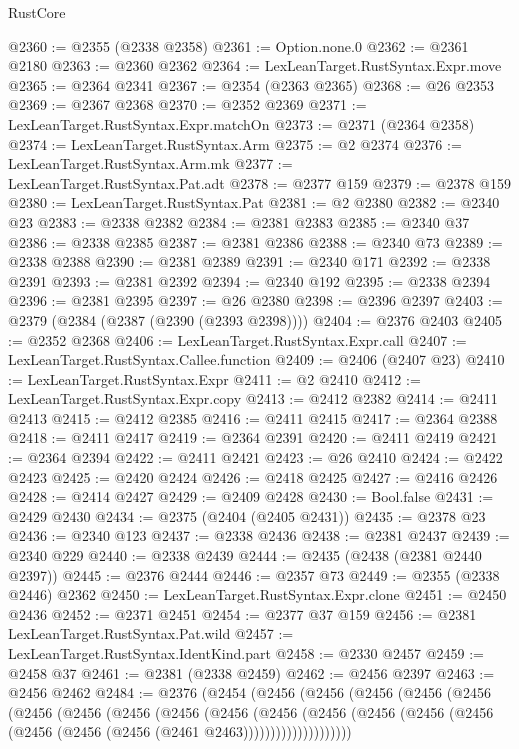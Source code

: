 \begin{lexlean}{RustCore}
\begin{coremodule}
@2360 := @2355 (@2338 @2358)
@2361 := Option.none.{0}
@2362 := @2361 @2180
@2363 := @2360 @2362
@2364 := LexLeanTarget.RustSyntax.Expr.move
@2365 := @2364 @2341
@2367 := @2354 (@2363 @2365)
@2368 := @26 @2353
@2369 := @2367 @2368
@2370 := @2352 @2369
@2371 := LexLeanTarget.RustSyntax.Expr.matchOn
@2373 := @2371 (@2364 @2358)
@2374 := LexLeanTarget.RustSyntax.Arm
@2375 := @2 @2374
@2376 := LexLeanTarget.RustSyntax.Arm.mk
@2377 := LexLeanTarget.RustSyntax.Pat.adt
@2378 := @2377 @159
@2379 := @2378 @159
@2380 := LexLeanTarget.RustSyntax.Pat
@2381 := @2 @2380
@2382 := @2340 @23
@2383 := @2338 @2382
@2384 := @2381 @2383
@2385 := @2340 @37
@2386 := @2338 @2385
@2387 := @2381 @2386
@2388 := @2340 @73
@2389 := @2338 @2388
@2390 := @2381 @2389
@2391 := @2340 @171
@2392 := @2338 @2391
@2393 := @2381 @2392
@2394 := @2340 @192
@2395 := @2338 @2394
@2396 := @2381 @2395
@2397 := @26 @2380
@2398 := @2396 @2397
@2403 := @2379 (@2384 (@2387 (@2390 (@2393 @2398))))
@2404 := @2376 @2403
@2405 := @2352 @2368
@2406 := LexLeanTarget.RustSyntax.Expr.call
@2407 := LexLeanTarget.RustSyntax.Callee.function
@2409 := @2406 (@2407 @23)
@2410 := LexLeanTarget.RustSyntax.Expr
@2411 := @2 @2410
@2412 := LexLeanTarget.RustSyntax.Expr.copy
@2413 := @2412 @2382
@2414 := @2411 @2413
@2415 := @2412 @2385
@2416 := @2411 @2415
@2417 := @2364 @2388
@2418 := @2411 @2417
@2419 := @2364 @2391
@2420 := @2411 @2419
@2421 := @2364 @2394
@2422 := @2411 @2421
@2423 := @26 @2410
@2424 := @2422 @2423
@2425 := @2420 @2424
@2426 := @2418 @2425
@2427 := @2416 @2426
@2428 := @2414 @2427
@2429 := @2409 @2428
@2430 := Bool.false
@2431 := @2429 @2430
@2434 := @2375 (@2404 (@2405 @2431))
@2435 := @2378 @23
@2436 := @2340 @123
@2437 := @2338 @2436
@2438 := @2381 @2437
@2439 := @2340 @229
@2440 := @2338 @2439
@2444 := @2435 (@2438 (@2381 @2440 @2397))
@2445 := @2376 @2444
@2446 := @2357 @73
@2449 := @2355 (@2338 @2446) @2362
@2450 := LexLeanTarget.RustSyntax.Expr.clone
@2451 := @2450 @2436
@2452 := @2371 @2451
@2454 := @2377 @37 @159
@2456 := @2381 LexLeanTarget.RustSyntax.Pat.wild
@2457 := LexLeanTarget.RustSyntax.IdentKind.part
@2458 := @2330 @2457
@2459 := @2458 @37
@2461 := @2381 (@2338 @2459)
@2462 := @2456 @2397
@2463 := @2456 @2462
@2484 := @2376
    (@2454
      (@2456
        (@2456
          (@2456
            (@2456
              (@2456
                (@2456
                  (@2456
                    (@2456
                      (@2456
                        (@2456
                          (@2456
                            (@2456
                              (@2456
                                (@2456 (@2456 (@2456 (@2456 (@2456 (@2461 @2463))))))))))))))))))))

\end{coremodule}
\end{lexlean}
